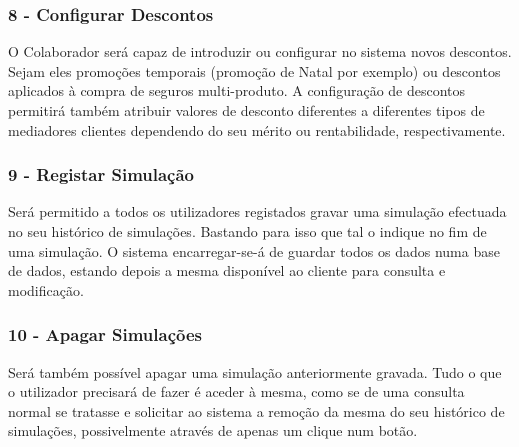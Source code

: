 \subsubsection{\textbf{8 - Configurar Descontos}}
O Colaborador será capaz de introduzir ou configurar no sistema novos descontos. Sejam eles promoções temporais (promoção de Natal por exemplo) ou descontos aplicados à compra de seguros multi-produto. A configuração de descontos permitirá também atribuir valores de desconto diferentes a diferentes tipos de mediadores clientes dependendo do seu mérito ou rentabilidade, respectivamente. 

\subsubsection{\textbf{9 - Registar Simulação}}
Será permitido a todos os utilizadores registados gravar uma simulação efectuada no seu histórico de simulações. Bastando para isso que tal o indique no fim de uma simulação. O sistema encarregar-se-á de guardar todos os dados numa base de dados, estando depois a mesma  disponível ao cliente para consulta e modificação.

\subsubsection{\textbf{10 - Apagar Simulações}}
Será também possível apagar uma simulação anteriormente gravada. Tudo o que o utilizador precisará de fazer é aceder à mesma, como se de uma consulta normal se tratasse e solicitar ao sistema a remoção da mesma do seu histórico de simulações, possivelmente através de apenas um clique num botão.

